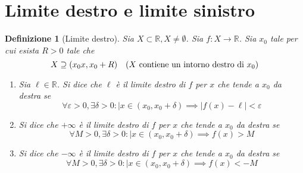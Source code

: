 \documentclass[11pt]{book}
\newtheorem{definition}{Definizione}[chapter]
\begin{document}
\section{Limite destro e limite sinistro}
\begin{definition}[Limite destro]
    Sia $X\subset\mathbb{R},X\neq\emptyset$. Sia $f:X\rightarrow\mathbb{R}$. Sia $x_0$ tale per cui esista $R>0$ tale che 
    \begin{equation*}
        X\supseteq(x_0x,x_0+R)\quad\textnormal{($X$ contiene un intorno destro di $x_0$)}
    \end{equation*}
    \begin{enumerate}
        \item Sia $\ell\in\mathbb{R}$. Si dice che $\ell$ è il limite destro di $f$ per $x$ che tende a $x_0$ da destra 
        se 
        \begin{equation*}
            \forall\varepsilon>0,\exists\delta>0:|x\in(x_0,x_0+\delta)\implies|f(x)-\ell|<\varepsilon
        \end{equation*}
        \item Si dice che $+\infty$ è il limite destro di $f$ per $x$ che tende a $x_0$ da destra 
        se 
        \begin{equation*}
            \forall M>0,\exists\delta>0:|x\in(x_0,x_0+\delta)\implies f(x)>M
        \end{equation*}
        \item Si dice che $-\infty$ è il limite destro di $f$ per $x$ che tende a $x_0$ da destra 
        se 
        \begin{equation*}
            \forall M>0,\exists\delta>0:|x\in(x_0,x_0+\delta)\implies f(x)<-M
        \end{equation*}
    \end{enumerate}
\end{definition}
\end{document}
